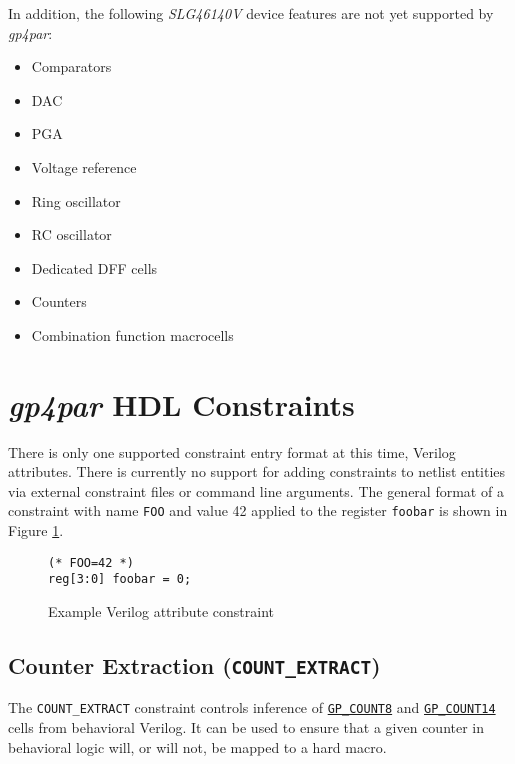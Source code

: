 \documentclass[11pt]{article}
\newcommand{\namestyle}[1]{\textit{#1}}
\newcommand{\tokenstyle}[1]{\texttt{#1}}
\newcommand{\wirestyle}[1]{\texttt{#1}}
\newcommand{\tokenref}[2]{\hyperref[#2]{\tokenstyle{#1}}}
\begin{document}
In addition, the following \namestyle{SLG46140V} device features are not yet supported by \namestyle{gp4par}:

\begin{itemize}
\item Comparators
\item DAC
\item PGA
\item Voltage reference
\item Ring oscillator
\item RC oscillator
\item Dedicated DFF cells
\item Counters
\item Combination function macrocells
\end{itemize}

\pagebreak
\section{\namestyle{gp4par} HDL Constraints}

There is only one supported constraint entry format at this time, Verilog attributes. There is currently no support for
adding constraints to netlist entities via external constraint files or command line arguments. The general format of a
constraint with name \tokenstyle{FOO} and value 42 applied to the register \wirestyle{foobar} is shown in Figure
\ref{constraint}.

\begin{figure}[h]
\begin{lstlisting}
(* FOO=42 *)
reg[3:0] foobar = 0;
\end{lstlisting}
\caption{Example Verilog attribute constraint}
\label{constraint}
\end{figure}


\pagebreak
\subsection{Counter Extraction (\tokenstyle{COUNT\_EXTRACT})}
\label{count-extract}

The \tokenstyle{COUNT\_EXTRACT} constraint controls inference of \tokenref{GP\_COUNT8}{gp-count8} and \tokenref{GP\_COUNT14}{gp-count14} cells from behavioral Verilog. It can be
used to ensure that a given counter in behavioral logic will, or will not, be mapped to a hard macro.
\end{document}
